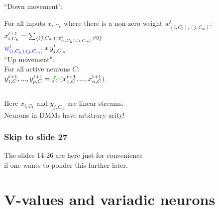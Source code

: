 \documentclass{beamer}
\newcommand{\msblue}[1]{{\color{myblue} #1}}
\newcommand{\msmagenta}[1]{{\color{mymagenta} #1}}
\newcommand{\msgreen}[1]{{\color{mygreen} #1}}
\begin{document}
\begin{frame}
\begin{columns}[T]
\begin{column}{0.3\textwidth}
{%
\tiny
``Down movement": 

\msblue{For all inputs $x_{i,C_k}$ where there is a non-zero weight $w_{(i,C_k), (j,C_m)}^t$:}\\[1ex]

{\scriptsize$x_{i,C_k}^{t+1} = \msblue{\sum}_{\{(j,C_m) | w_{(i,C_k), (j,C_m)}^t \neq 0\}}$\\[0.1ex]$\msblue{w_{(i,C_k), (j,C_m)}^t }* y_{j, C_m}^{t}.$}\\[3ex]

``Up movement":\\[0.1ex]  

\msgreen{For all active neurons $C$:}\\[1ex]

{\scriptsize $y^{t+1}_{1,C},...,y^{t+1}_{p,C} = \msgreen{f_C} (x^{t+1}_{1,C},...,x^{t+1}_{n,C})$.}
}

\end{column}
\end{columns}


Here $x_{i,C_k}$ and $y_{j,C_m}$ are linear streams.\\
\msmagenta{Neurons in DMMs have arbitrary arity!}

\end{frame}


\begin{frame}

\frametitle{Skip to slide 27}

The slides 14-26 are here just for convenience\\ if one wants to ponder this further later.

\end{frame}




\section{V-values and variadic neurons}
\end{document}
